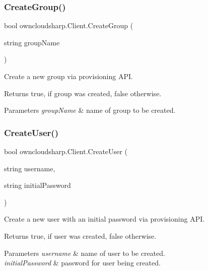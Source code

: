 \subsubsection{\texorpdfstring{Create\+Group()}{CreateGroup()}}
{\footnotesize\ttfamily bool owncloudsharp.\+Client.\+Create\+Group (\begin{DoxyParamCaption}\item[{string}]{group\+Name }\end{DoxyParamCaption})}



Create a new group via provisioning A\+PI. 

\begin{DoxyReturn}{Returns}
{\ttfamily true}, if group was created, {\ttfamily false} otherwise.
\end{DoxyReturn}

\begin{DoxyParams}{Parameters}
{\em group\+Name} & name of group to be created.\\
\hline
\end{DoxyParams}
\mbox{\label{classowncloudsharp_1_1_client_a7e285455e3f0cf437d9359956b6feaa5}} 
\subsubsection{\texorpdfstring{Create\+User()}{CreateUser()}}
{\footnotesize\ttfamily bool owncloudsharp.\+Client.\+Create\+User (\begin{DoxyParamCaption}\item[{string}]{username,  }\item[{string}]{initial\+Password }\end{DoxyParamCaption})}



Create a new user with an initial password via provisioning A\+PI. 

\begin{DoxyReturn}{Returns}
{\ttfamily true}, if user was created, {\ttfamily false} otherwise.
\end{DoxyReturn}

\begin{DoxyParams}{Parameters}
{\em username} & name of user to be created.\\
\hline
{\em initial\+Password} & password for user being created.\\
\hline
\end{DoxyParams}
\mbox{\label{classowncloudsharp_1_1_client_a8936411abf14870d211e4a62be3d7840}} 
